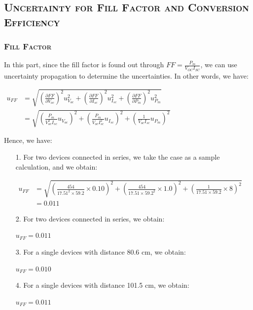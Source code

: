 \documentclass[a4paper,12pt]{article}
\begin{document}
\begin{appendices}
\subsection{\textsc{Uncertainty for Fill Factor and Conversion Efficiency}}
\subsubsection{\textsc{Fill Factor}}
In this part, since the fill factor is found out through $\displaystyle FF = \frac{P_m}{V_{OC}I_{SC}} $, we can use uncertainty propagation to determine the uncertainties. In other words, we have:
\begin{center}
$\begin{aligned} 
u_{F F} &=\sqrt{\left(\frac{\partial F F}{\partial V_{o c}}\right)^{2} u_{V_{o c}}^{2}+\left(\frac{\partial F F}{\partial I_{s c}}\right)^{2} u_{I_{s c}}^{2}+\left(\frac{\partial F F}{\partial P_{m}}\right)^{2} u_{P_{m}}^{2}} \\ 
			&=\sqrt{\left(\frac{P_{m}}{V_{o c}^{2} I_{s c}} u_{V_{o c}}\right)^{2}+\left(\frac{P_{m}}{V_{o c} I_{s c}^{2}} u_{I_{s c}}\right)^{2}+\left(\frac{1}{V_{o c} I_{s c}} u_{P_{m}}\right)^{2}} 
\end{aligned}$
\end{center}
Hence, we have:
\begin{itemize}
\item[1.] For two devices connected in series, we take the case as a sample calculation, and we obtain:
			\begin{center}
			$\begin{aligned} 
			u_{F F} &=\sqrt{\left(\frac{454}{17.51^2\times 59.2}\times0.10\right)^2 + \left(\frac{454}{17.51\times 59.2^2}\times1.0\right)^2 + \left(\frac{1}{17.51\times 59.2}\times8\right)^2} \\ 
						&= 0.011
			\end{aligned}$
			\end{center}
\item[2.] For two devices connected in series, we obtain:
			\begin{center}
			$  u_{F F} = 0.011$
			\end{center}
\item[3.] For a single devices with distance 80.6 cm, we obtain:
			\begin{center}
			$  u_{F F} = 0.010$
			\end{center}
\item[4.] For a single devices with distance 101.5 cm, we obtain:
			\begin{center}
			$  u_{F F} = 0.011$
			\end{center}
\end{itemize}


\end{appendices}
\end{document}

